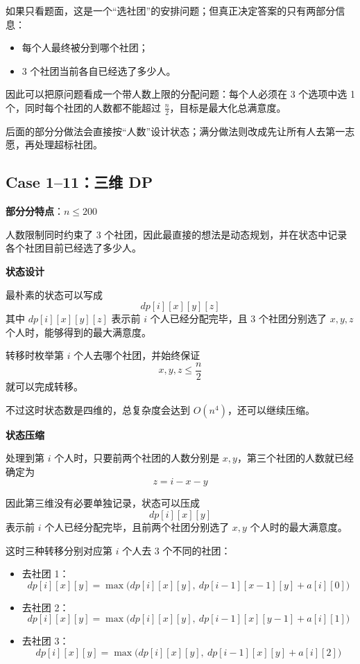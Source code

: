 \documentclass{book}
\begin{document}
如果只看题面，这是一个“选社团”的安排问题；但真正决定答案的只有两部分信息：

\begin{itemize}[leftmargin=2em,itemsep=1pt,topsep=2pt,parsep=0pt,partopsep=0pt]
    \item 每个人最终被分到哪个社团；
    \item 3 个社团当前各自已经选了多少人。
\end{itemize}

因此可以把原问题看成一个带人数上限的分配问题：每个人必须在 3 个选项中选 1 个，同时每个社团的人数都不能超过 $\frac{n}{2}$，目标是最大化总满意度。

后面的部分分做法会直接按“人数”设计状态；满分做法则改成先让所有人去第一志愿，再处理超标社团。

\subsection{Case 1--11：三维 DP}

\textbf{部分分特点}：$n \le 200$

人数限制同时约束了 3 个社团，因此最直接的想法是动态规划，并在状态中记录各个社团目前已经选了多少人。

\par\medskip
\noindent\textbf{状态设计}
\par\medskip
最朴素的状态可以写成
\[
dp[i][x][y][z]
\]
其中 $dp[i][x][y][z]$ 表示前 $i$ 个人已经分配完毕，且 3 个社团分别选了 $x,y,z$ 个人时，能够得到的最大满意度。

转移时枚举第 $i$ 个人去哪个社团，并始终保证
\[
x,y,z \le \frac{n}{2}
\]
就可以完成转移。

不过这时状态数是四维的，总复杂度会达到 $O(n^4)$，还可以继续压缩。

\par\medskip
\noindent\textbf{状态压缩}
\par\medskip
处理到第 $i$ 个人时，只要前两个社团的人数分别是 $x,y$，第三个社团的人数就已经确定为
\[
z = i - x - y
\]

因此第三维没有必要单独记录，状态可以压成
\[
dp[i][x][y]
\]
表示前 $i$ 个人已经分配完毕，且前两个社团分别选了 $x,y$ 个人时的最大满意度。

这时三种转移分别对应第 $i$ 个人去 3 个不同的社团：

\begin{itemize}[leftmargin=2.2em,itemsep=2pt,topsep=2pt]
    \item 去社团 1：
    \[
    dp[i][x][y]
    =
    \max\bigl(dp[i][x][y],\ dp[i-1][x-1][y] + a[i][0]\bigr)
    \]

    \item 去社团 2：
    \[
    dp[i][x][y]
    =
    \max\bigl(dp[i][x][y],\ dp[i-1][x][y-1] + a[i][1]\bigr)
    \]

    \item 去社团 3：
    \[
    dp[i][x][y]
    =
    \max\bigl(dp[i][x][y],\ dp[i-1][x][y] + a[i][2]\bigr)
    \]
\end{itemize}
\end{document}
